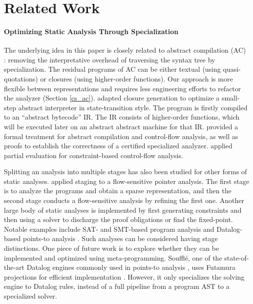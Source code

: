\section{Related Work}

\paragraph{Optimizing Static Analysis Through Specialization} The underlying
idea in this paper is closely related to abstract compilation (AC)
\cite{Boucher:1996:ACN:647473.727587}: removing the interpretative overhead of
traversing the syntax tree by specialization. The residual programs of AC can
be either textual (using quasi-quotations) or closures (using higher-order
functions).  Our approach is more flexible between representations and requires
less engineering efforts to refactor the analyzer (Section \ref{cs_ac}).
\citet{Johnson:2013:OAA:2500365.2500604} adapted closure generation to optimize a
small-step abstract interpreter in state-transition style. The program
is firstly compiled to an ``abstract bytecode'' IR. The IR consists of higher-order
functions, which will be executed later on an abstract abstract machine for
that IR.  \citet{damian1999partial} provided a formal treatment for abstract
compilation and control-flow analysis, as well as proofs to establish the
correctness of a certified specialized analyzer.  \citet{amtoft1999partial}
applied partial evaluation for constraint-based control-flow analysis.

Splitting an analysis into multiple stages has also been studied for other
forms of static analyses.
\citet{DBLP:conf/cgo/HardekopfL11} applied staging to a
flow-sensitive pointer analysis. The first stage is to analyze the
programs and obtain a sparse representation, and then the second
stage conducts a flow-sensitive analysis by refining the first
one. Another large body of static analyses is implemented by
first generating constraints and then using a solver to discharge the
proof obligations or find the fixed-point. Notable examples include
SAT- and SMT-based program analysis
\cite{Gulwani:2008:PAC:1375581.1375616} and Datalog-based points-to
analysis \cite{Smaragdakis:2015:PA:2802194.2802195}.
Such analyses can be considered having stage distinctions.  One piece of future
work is to explore whether they can be implemented and optimized using
meta-programming.
Souffl{\'e}, one of the state-of-the-art Datalog engines commonly used in
points-to analysis \cite{Antoniadis:2017:PDS:3088515.3088522}, uses Futamura
projections for efficient implementation \cite{10.1007/978-3-319-41540-6_23}.
However, it only specializes the solving engine to Datalog rules, instead of a
full pipeline from a program AST to a specialized solver.

